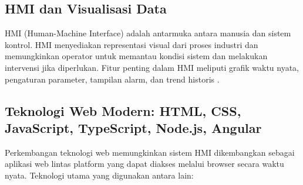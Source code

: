 
\subsection{HMI dan Visualisasi Data}
HMI (Human-Machine Interface) adalah antarmuka antara manusia dan sistem kontrol. HMI menyediakan representasi visual dari proses industri dan memungkinkan operator untuk memantau kondisi sistem dan melakukan intervensi jika diperlukan. Fitur penting dalam HMI meliputi grafik waktu nyata, pengaturan parameter, tampilan alarm, dan trend historis \parencite{seeed2024fuxa}.

\subsection{Teknologi Web Modern: HTML, CSS, JavaScript, TypeScript, Node.js, Angular}
Perkembangan teknologi web memungkinkan sistem HMI dikembangkan sebagai aplikasi web lintas platform yang dapat diakses melalui browser secara waktu nyata. Teknologi utama yang digunakan antara lain:

